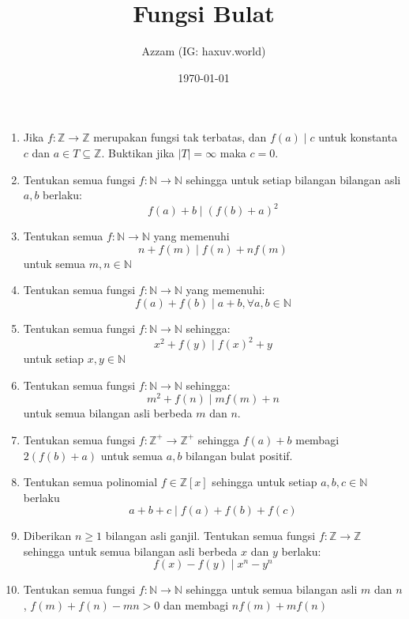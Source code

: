 \documentclass[11pt]{scrartcl}
\title{Fungsi Bulat}
\author{Azzam (IG: haxuv.world)}
\date{\today}
\begin{document}
\maketitle
\begin{enumerate}
    \item Jika $f : \mathbb{Z} \to \mathbb{Z}$ merupakan fungsi tak terbatas, dan $f(a) \mid c$ untuk konstanta $c$ dan $a \in T \subseteq \mathbb{Z}$. Buktikan jika $|T| = \infty$ maka $c = 0$.
    
    \item Tentukan semua fungsi $f : \mathbb{N} \to \mathbb{N}$ sehingga untuk setiap bilangan bilangan asli $a, b$ berlaku:
    \[
    f(a)+b \mid (f(b)+a)^2
    \]
    
    \item Tentukan semua $f : \mathbb{N} \to \mathbb{N}$ yang memenuhi
    \[
    n+f(m) \mid f(n) + nf(m)
    \]
    untuk semua $m,n \in \mathbb{N}$
    
    \item Tentukan semua fungsi $f : \mathbb{N} \to \mathbb{N}$ yang memenuhi:
    \[
    f(a)+f(b) \mid a+b, \forall a,b \in \mathbb{N}
    \]
    
    \item Tentukan semua fungsi $f : \mathbb{N} \to \mathbb{N}$ sehingga:
    \[
    x^2+f(y) \mid f(x)^2 +y
    \]
    untuk setiap $x, y \in \mathbb{N}$
    
    \item Tentukan semua fungsi $f : \mathbb{N} \to \mathbb{N}$ sehingga:
    \[
    m^2+f(n) \mid mf(m)+n
    \]
    untuk semua bilangan asli berbeda $m$ dan $n$.
    
    \item Tentukan semua fungsi $f : \mathbb{Z}^+ \to \mathbb{Z}^+$ sehingga $f(a) + b$ membagi $2(f(b) + a)$ untuk semua $a, b$ bilangan bulat positif.
    
    \item Tentukan semua polinomial $f \in \mathbb{Z}[x]$ sehingga untuk setiap $a, b, c \in \mathbb{N}$ berlaku
    \[
    a+b+c \mid f(a)+f(b)+f(c)
    \]
    
    \item Diberikan $n \ge 1$ bilangan asli ganjil. Tentukan semua fungsi $f : \mathbb{Z} \to \mathbb{Z}$ sehingga untuk semua bilangan asli berbeda $x$ dan $y$ berlaku:
    \[
    f(x) - f(y) \mid x^n-y^n
    \]
    
    \item Tentukan semua fungsi $f : \mathbb{N} \to \mathbb{N}$ sehingga untuk semua bilangan asli $m$ dan $n$, $f(m) + f(n) - mn > 0$ dan membagi $nf(m) + mf(n)$
    

\end{enumerate}
\end{document}
